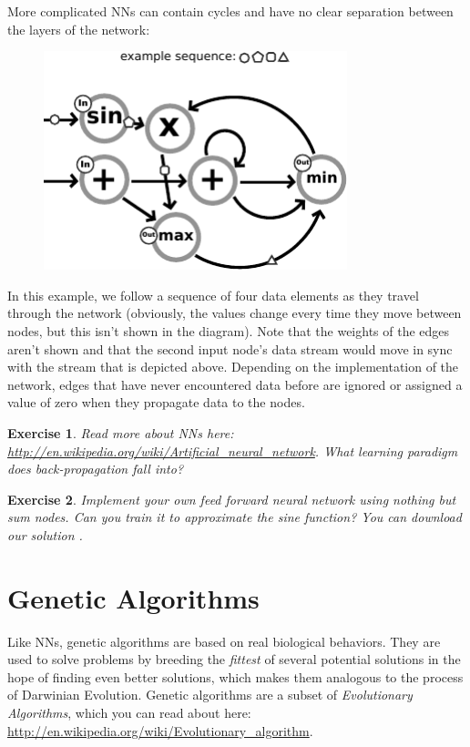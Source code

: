 \documentclass[12pt]{article}
\newtheorem{ex}{Exercise}
\begin{document}
More complicated NNs can contain cycles and have no clear separation between the layers of the network:

\begin{figure}[H]
\centerline{\includegraphics[height=2.5in]{figs/ComplexNN}}
\end{figure}
In this example, we follow a sequence of four data elements as they travel through the network (obviously, the values change every time they move between nodes, but this isn't shown in the diagram). Note that the weights of the edges aren't shown and that the second input node's data stream would move in sync with the stream that is depicted above. Depending on the implementation of the network, edges that have never encountered data before are ignored or assigned a value of zero when they propagate data to the nodes.


\begin{ex}
Read more about NNs here: \url{http://en.wikipedia.org/wiki/Artificial_neural_network}.
 What learning paradigm does back-propagation fall into?
\end{ex}

\begin{ex}
Implement your own feed forward neural network using nothing but sum nodes. Can you train it to approximate the sine function? You can download our solution .
\end{ex}

\section{Genetic Algorithms}

Like NNs, genetic algorithms are based on real biological behaviors. They are used to solve problems by breeding the \emph{fittest} of several potential solutions in the hope of finding even better solutions, which makes them analogous to the process of Darwinian Evolution. Genetic algorithms are a subset of \emph{Evolutionary Algorithms}, which you can read about here: \url{http://en.wikipedia.org/wiki/Evolutionary_algorithm}.
\end{document}
